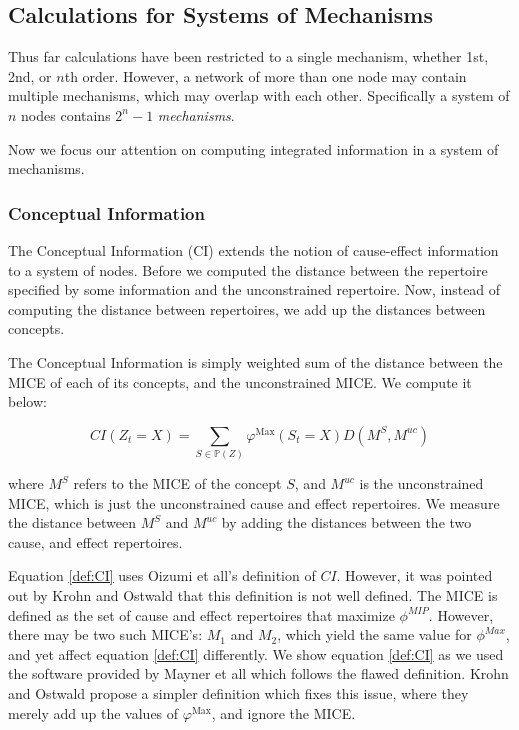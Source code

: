 \subsection{Calculations for Systems of Mechanisms}
\label{sec:systems}
Thus far calculations have been restricted to a single mechanism, whether 1st, 2nd, or $n$th order. However, a network of more than one node may contain multiple mechanisms, which may overlap with each other. Specifically a system of $n$ nodes contains $2^n-1$ \textit{mechanisms}.

Now we focus our attention on computing integrated information in a system of mechanisms. 

\subsubsection{Conceptual Information}
\label{sec:CI}
The Conceptual Information (CI) extends the notion of cause-effect information to a system of nodes. Before we computed the distance between the repertoire specified by some information and the unconstrained repertoire. Now, instead of computing the distance between repertoires, we add up the distances between concepts.

The Conceptual Information is simply weighted sum of the distance between the MICE of each of its concepts, and the unconstrained MICE. We compute it below:

\begin{equation}
\label{def:CI}
CI(Z_t = X) = \sum \limits_{S \in \mathbb{P}(Z)} \varphi^{\text{Max}}(S_t=X) D(M^S, M^{uc})
\end{equation}

where $M^S$ refers to the MICE of the concept $S$, and $M^{uc}$ is the unconstrained MICE, which is just the unconstrained cause and effect repertoires. We measure the distance between $M^S$ and $M^{uc}$ by adding the distances between the two cause, and effect repertoires.

\begin{remark}
	Equation \ref{def:CI} uses Oizumi et all's \cite{oizumi2014phenomenology} definition of $CI$. However, it was pointed out by Krohn and Ostwald \cite{krohn2016computing} that this definition is not well defined. The MICE is defined as the set of cause and effect repertoires that maximize $\phi^{MIP}$. However, there may be two such MICE's: $M_1$ and $M_2$, which yield the same value for $\phi^{Max}$, and yet affect equation \ref{def:CI} differently. We show equation \ref{def:CI} as we used the software provided by Mayner et all \cite{pyphi} which follows the flawed definition. Krohn and Ostwald propose a simpler definition which fixes this issue, where they merely add up the values of $\varphi^{\text{Max}}$, and ignore the MICE.
\end{remark}

